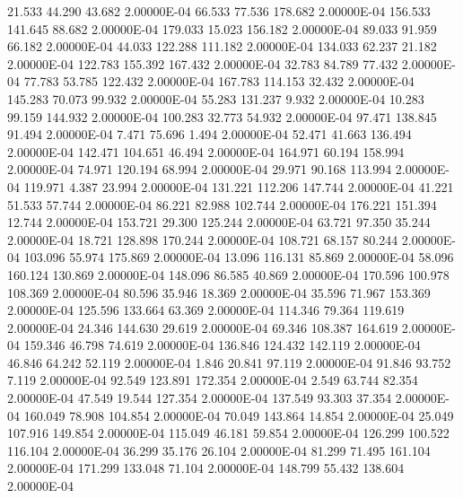     21.533    44.290    43.682  2.00000E-04
    66.533    77.536   178.682  2.00000E-04
   156.533   141.645    88.682  2.00000E-04
   179.033    15.023   156.182  2.00000E-04
    89.033    91.959    66.182  2.00000E-04
    44.033   122.288   111.182  2.00000E-04
   134.033    62.237    21.182  2.00000E-04
   122.783   155.392   167.432  2.00000E-04
    32.783    84.789    77.432  2.00000E-04
    77.783    53.785   122.432  2.00000E-04
   167.783   114.153    32.432  2.00000E-04
   145.283    70.073    99.932  2.00000E-04
    55.283   131.237     9.932  2.00000E-04
    10.283    99.159   144.932  2.00000E-04
   100.283    32.773    54.932  2.00000E-04
    97.471   138.845    91.494  2.00000E-04
     7.471    75.696     1.494  2.00000E-04
    52.471    41.663   136.494  2.00000E-04
   142.471   104.651    46.494  2.00000E-04
   164.971    60.194   158.994  2.00000E-04
    74.971   120.194    68.994  2.00000E-04
    29.971    90.168   113.994  2.00000E-04
   119.971     4.387    23.994  2.00000E-04
   131.221   112.206   147.744  2.00000E-04
    41.221    51.533    57.744  2.00000E-04
    86.221    82.988   102.744  2.00000E-04
   176.221   151.394    12.744  2.00000E-04
   153.721    29.300   125.244  2.00000E-04
    63.721    97.350    35.244  2.00000E-04
    18.721   128.898   170.244  2.00000E-04
   108.721    68.157    80.244  2.00000E-04
   103.096    55.974   175.869  2.00000E-04
    13.096   116.131    85.869  2.00000E-04
    58.096   160.124   130.869  2.00000E-04
   148.096    86.585    40.869  2.00000E-04
   170.596   100.978   108.369  2.00000E-04
    80.596    35.946    18.369  2.00000E-04
    35.596    71.967   153.369  2.00000E-04
   125.596   133.664    63.369  2.00000E-04
   114.346    79.364   119.619  2.00000E-04
    24.346   144.630    29.619  2.00000E-04
    69.346   108.387   164.619  2.00000E-04
   159.346    46.798    74.619  2.00000E-04
   136.846   124.432   142.119  2.00000E-04
    46.846    64.242    52.119  2.00000E-04
     1.846    20.841    97.119  2.00000E-04
    91.846    93.752     7.119  2.00000E-04
    92.549   123.891   172.354  2.00000E-04
     2.549    63.744    82.354  2.00000E-04
    47.549    19.544   127.354  2.00000E-04
   137.549    93.303    37.354  2.00000E-04
   160.049    78.908   104.854  2.00000E-04
    70.049   143.864    14.854  2.00000E-04
    25.049   107.916   149.854  2.00000E-04
   115.049    46.181    59.854  2.00000E-04
   126.299   100.522   116.104  2.00000E-04
    36.299    35.176    26.104  2.00000E-04
    81.299    71.495   161.104  2.00000E-04
   171.299   133.048    71.104  2.00000E-04
   148.799    55.432   138.604  2.00000E-04
